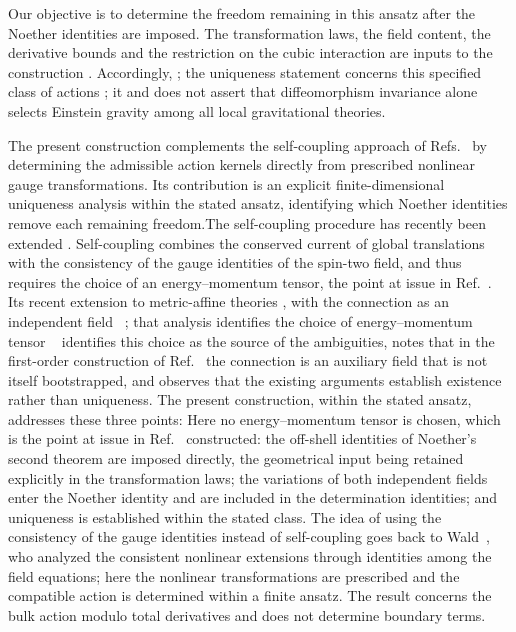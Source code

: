 \documentclass[prd,aps,preprint,superscriptaddress,nofootinbib,amsmath,amssymb,eqsecnum]{revtex4-2}
\providecommand{\DIFaddtex}[1]{{\protect\color{blue} \sf #1}} %
\providecommand{\DIFdeltex}[1]{{\protect\color{red} \scriptsize #1}} %
\providecommand{\DIFaddbegin}{} %
\providecommand{\DIFaddend}{} %
\providecommand{\DIFdelbegin}{} %
\providecommand{\DIFdelend}{} %
\providecommand{\DIFadd}[1]{\texorpdfstring{\DIFaddtex{#1}}{#1}} %
\providecommand{\DIFdel}[1]{\texorpdfstring{\DIFdeltex{#1}}{}} %
\begin{document}
Our objective is to determine the freedom remaining in this ansatz after the Noether
identities are imposed. The transformation laws, the field content, the derivative bounds and
the restriction on the cubic interaction are inputs to the construction\DIFdelbegin \DIFdel{. Accordingly, }\DIFdelend \DIFaddbegin \DIFadd{; }\DIFaddend the
uniqueness statement concerns this specified class of actions \DIFdelbegin \DIFdel{; it }\DIFdelend \DIFaddbegin \DIFadd{and }\DIFaddend does not assert that
diffeomorphism invariance alone selects Einstein gravity among all local gravitational
theories.

The \DIFdelbegin \DIFdel{present }\DIFdelend construction complements the self-coupling approach of
Refs.~\cite{Deser1970,Deser2010}\DIFdelbegin \DIFdel{by determining the admissible action kernels directly from
prescribed nonlinear gauge transformations. Its contribution is an explicit finite-dimensional
uniqueness analysis within the stated ansatz, identifying which Noether identities remove
each remaining freedom.The self-coupling procedure has
recently been extended }\DIFdelend \DIFaddbegin \DIFadd{. Self-coupling combines the conserved current of global
translations with the consistency of the gauge identities of the spin-two field, and thus
requires the choice of an energy--momentum tensor, the point at issue in
Ref.~\cite{Padmanabhan2008}. Its recent extension }\DIFaddend to metric-affine theories\DIFdelbegin \DIFdel{, with the connection as an independent
field~\cite{Delhom2023}
; that analysis identifies the choice of energy--momentum tensor }\DIFdelend \DIFaddbegin \DIFadd{~\cite{Delhom2023}
identifies this choice }\DIFaddend as the source of the ambiguities, notes that in the first-order
construction of Ref.~\cite{Deser1970} the connection is an auxiliary field that is not itself
bootstrapped, and observes that the existing arguments establish existence rather than
uniqueness. \DIFdelbegin \DIFdel{The
present construction, within the stated ansatz, addresses these three points: }\DIFdelend \DIFaddbegin \DIFadd{Here }\DIFaddend no energy--momentum tensor is \DIFdelbegin \DIFdel{chosen, which is the point at issue in
Ref.~\cite{Padmanabhan2008}}\DIFdelend \DIFaddbegin \DIFadd{constructed: the off-shell identities of
Noether's second theorem are imposed directly}\DIFaddend , the geometrical input being retained \DIFdelbegin \DIFdel{explicitly }\DIFdelend in the
transformation laws; the variations of both independent fields enter the \DIFdelbegin \DIFdel{Noether identity
and are included in the determination}\DIFdelend \DIFaddbegin \DIFadd{identities}\DIFaddend ; and
uniqueness is established within the stated class. The idea of using the consistency of the
gauge identities instead of self-coupling goes back to Wald~\cite{Wald1986}, who analyzed the
consistent nonlinear extensions through identities among the field equations; here the
nonlinear transformations are prescribed and the compatible action is determined within a
finite ansatz. The result concerns the bulk action modulo total derivatives and does not
determine boundary terms.
\end{document}
